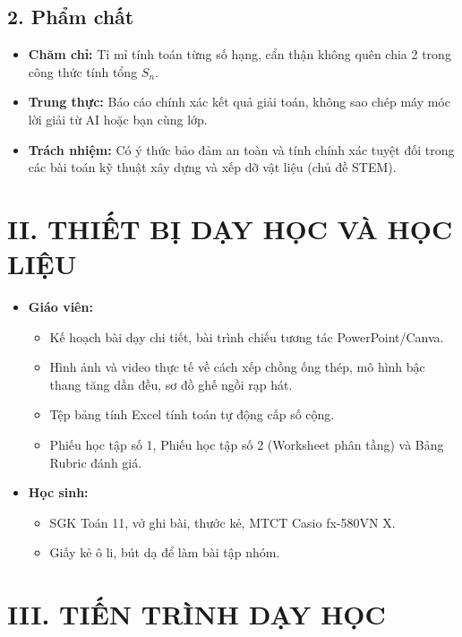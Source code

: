 \documentclass[12pt, a4paper]{article}
\begin{document}
\subsection*{2. Phẩm chất}  
\begin{itemize}[leftmargin=1.2cm]  
    \item \textbf{Chăm chỉ:} Tỉ mỉ tính toán từng số hạng, cẩn thận không quên chia 2 trong công thức tính tổng $S_n$.  
    \item \textbf{Trung thực:} Báo cáo chính xác kết quả giải toán, không sao chép máy móc lời giải từ AI hoặc bạn cùng lớp.  
    \item \textbf{Trách nhiệm:} Có ý thức bảo đảm an toàn và tính chính xác tuyệt đối trong các bài toán kỹ thuật xây dựng và xếp dỡ vật liệu (chủ đề STEM).  
\end{itemize}  
  
\section*{II. THIẾT BỊ DẠY HỌC VÀ HỌC LIỆU}  
\begin{itemize}[leftmargin=1.2cm]  
    \item \textbf{Giáo viên:}  
    \begin{itemize}[leftmargin=0.6cm]  
        \item Kế hoạch bài dạy chi tiết, bài trình chiếu tương tác PowerPoint/Canva.  
        \item Hình ảnh và video thực tế về cách xếp chồng ống thép, mô hình bậc thang tăng dần đều, sơ đồ ghế ngồi rạp hát.  
        \item Tệp bảng tính Excel tính toán tự động cấp số cộng.  
        \item Phiếu học tập số 1, Phiếu học tập số 2 (Worksheet phân tầng) và Bảng Rubric đánh giá.  
    \end{itemize}  
    \item \textbf{Học sinh:}  
    \begin{itemize}[leftmargin=0.6cm]  
        \item SGK Toán 11, vở ghi bài, thước kẻ, MTCT Casio fx-580VN X.  
        \item Giấy kẻ ô li, bút dạ để làm bài tập nhóm.  
    \end{itemize}  
\end{itemize}  
  
\section*{III. TIẾN TRÌNH DẠY HỌC}  
  
\end{document}
